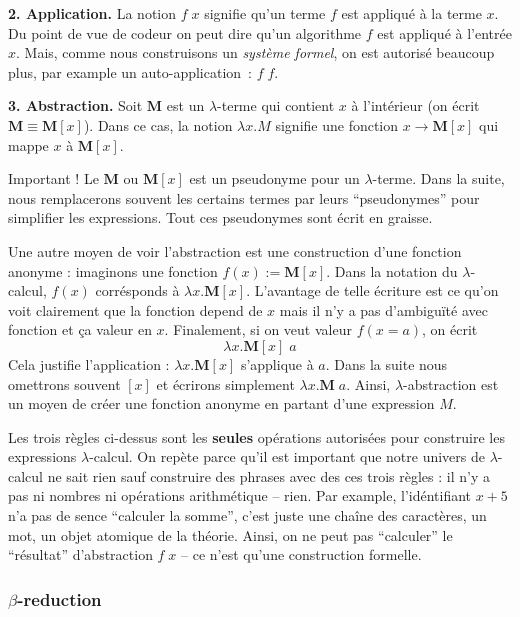 \textbf{2. Application.} La notion $f \; x$ signifie qu'un terme $f$ est appliqué à la terme $x$. Du point de vue de codeur on peut dire qu'un algorithme $f$ est appliqué à l'entrée $x$. Mais, comme nous construisons un \emph{système formel}, on est autorisé beaucoup plus, par example un auto-application~: $f \; f$.

\textbf{3. Abstraction.} Soit $\mathbf{M}$ est un $\lambda$-terme qui contient $x$ à l'intérieur (on écrit $\mathbf{M} \equiv \mathbf{M}[x]$). Dans ce cas, la notion $\lambda x.M$ signifie une fonction $x \to \mathbf{M}[x]$ qui mappe $x$ à $\mathbf{M}[x]$.
\begin{remark}
Important ! Le $\mathbf{M}$ ou $\mathbf{M}[x]$ est un pseudonyme pour un $\lambda$-terme. Dans la suite, nous remplacerons souvent les certains termes par leurs ``pseudonymes'' pour simplifier les expressions. Tout ces pseudonymes sont écrit en graisse.
\end{remark}
Une autre moyen de voir l'abstraction est une construction d'une fonction anonyme : imaginons une fonction $f(x) := \mathbf{M}[x]$. Dans la notation du $\lambda$-calcul, $f(x)$ corrésponds à $\lambda x.\mathbf{M}[x]$. L'avantage de telle écriture est ce qu'on voit clairement que la fonction depend de $x$ mais il n'y a pas d'ambiguïté avec fonction et ça valeur en $x$. Finalement, si on veut valeur $f(x=a)$, on écrit $$\lambda x. \mathbf{M}[x] \; a$$
Cela justifie l'application : $\lambda x. \mathbf{M}[x]$ s'applique à $a$.
Dans la suite nous omettrons souvent $[x]$ et écrirons simplement $\lambda x. \mathbf{M} \; a$.
Ainsi, $\lambda$-abstraction est un moyen de créer une fonction anonyme en partant d'une expression $M$.

Les trois règles ci-dessus sont les \textbf{seules} opérations autorisées pour construire les expressions $\lambda$-calcul.
On repète parce qu'il est important que notre univers de $\lambda$-calcul ne sait rien sauf construire des phrases avec des ces trois règles : il n'y a pas ni nombres ni opérations arithmétique -- rien.
Par example, l'idéntifiant $x+5$ n'a pas de sence ``calculer la somme'', c'est juste une chaîne des caractères, un mot, un objet atomique de la théorie.
Ainsi, on ne peut pas ``calculer'' le ``résultat'' d'abstraction $f \; x$ -- ce n'est qu'une construction formelle.

\subsubsection*{$\beta$-reduction} \label{beta-reduction}

